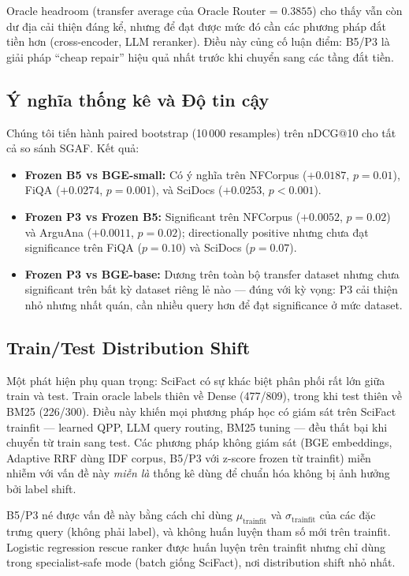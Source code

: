 Oracle headroom (transfer average của Oracle Router = $0.3855$) cho thấy vẫn còn dư địa cải thiện đáng
kể, nhưng để đạt được mức đó cần các phương pháp đắt tiền hơn (cross-encoder, LLM reranker). Điều này
củng cố luận điểm: B5/P3 là giải pháp ``cheap repair'' hiệu quả nhất trước khi chuyển sang các tầng
đắt tiền.

\subsection{Ý nghĩa thống kê và Độ tin cậy}

Chúng tôi tiến hành paired bootstrap (10\,000 resamples) trên nDCG@10 cho tất cả so sánh SGAF. Kết quả:

\begin{itemize}[leftmargin=1.6em,itemsep=2pt]
  \item \textbf{Frozen B5 vs BGE-small:} Có ý nghĩa trên NFCorpus ($+0.0187$, $p=0.01$), FiQA ($+0.0274$,
  $p=0.001$), và SciDocs ($+0.0253$, $p<0.001$).
  \item \textbf{Frozen P3 vs Frozen B5:} Significant trên NFCorpus ($+0.0052$, $p=0.02$) và ArguAna
  ($+0.0011$, $p=0.02$); directionally positive nhưng chưa đạt significance trên FiQA ($p=0.10$) và
  SciDocs ($p=0.07$).
  \item \textbf{Frozen P3 vs BGE-base:} Dương trên toàn bộ transfer dataset nhưng chưa significant
  trên bất kỳ dataset riêng lẻ nào --- đúng với kỳ vọng: P3 cải thiện nhỏ nhưng nhất quán, cần nhiều
  query hơn để đạt significance ở mức dataset.
\end{itemize}

\subsection{Train/Test Distribution Shift}

Một phát hiện phụ quan trọng: SciFact có sự khác biệt phân phối rất lớn giữa train và test. Train oracle
labels thiên về Dense (477/809), trong khi test thiên về BM25 (226/300). Điều này khiến mọi phương pháp
học có giám sát trên SciFact trainfit --- learned QPP, LLM query routing, BM25 tuning --- đều thất bại
khi chuyển từ train sang test. Các phương pháp không giám sát (BGE embeddings, Adaptive RRF dùng IDF
corpus, B5/P3 với z-score frozen từ trainfit) miễn nhiễm với vấn đề này \emph{miễn là} thống kê dùng để
chuẩn hóa không bị ảnh hưởng bởi label shift.

B5/P3 né được vấn đề này bằng cách chỉ dùng $\mu_{\text{trainfit}}$ và $\sigma_{\text{trainfit}}$ của
các đặc trưng query (không phải label), và không huấn luyện tham số mới trên trainfit. Logistic
regression rescue ranker được huấn luyện trên trainfit nhưng chỉ dùng trong specialist-safe mode (batch
giống SciFact), nơi distribution shift nhỏ nhất.
